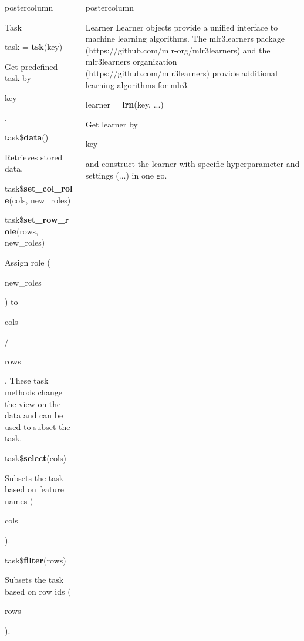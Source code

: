 \documentclass{beamer}
\newlength{\columnheight} %
\newcommand{\codeinline}[1]{\begin{codeboxinline}#1\end{codeboxinline}}
\begin{document}
\begin{frame}[fragile]{}
\begin{columns}
\begin{column}{.245\textwidth}
\begin{beamercolorbox}[center]{postercolumn}
\begin{minipage}{.98\textwidth}
{\begin{myblock}{Task}
\begin{codebox}
								task = \textbf{tsk}(key)
							\end{codebox}
							Get predefined task by \codeinline{key}.
							\\
							\begin{codebox}
								task\$\textbf{data}()
							\end{codebox}
							Retrieves stored data.
							\\
							\begin{codebox}
								task\$\textbf{set\_col\_role}(cols, new\_roles)
							\end{codebox}
							\begin{codebox}
								task\$\textbf{set\_row\_role}(rows, new\_roles)
							\end{codebox}
							Assign role (\codeinline{new\_roles}) to \codeinline{cols} / \codeinline{rows}. These task methods change the view on the data and can be used to subset the task.
							\\
							\begin{codebox}
								task\$\textbf{select}(cols)
							\end{codebox}
							Subsets the task based on feature names (\codeinline{cols}).
							\\
							\begin{codebox}
								task\$\textbf{filter}(rows)
							\end{codebox}
							Subsets the task based on row ids (\codeinline{rows}).
						\end{myblock}
						\vfill
					}
				\end{minipage}
			\end{beamercolorbox}
		\end{column}
		\begin{column}{.245\textwidth}
			\begin{beamercolorbox}[center]{postercolumn}
				\begin{minipage}{.98\textwidth}
					\parbox[t][\columnheight]{\textwidth}{
						\begin{myblock}{Learner}
							Learner objects provide a unified interface to machine learning algorithms. The mlr3learners package (https://github.com/mlr-org/mlr3learners) and the mlr3learners organization (https://github.com/mlr3learners) provide additional learning algorithms for mlr3.
							\\
							\begin{codebox}
								learner = \textbf{lrn}(key, ...)
							\end{codebox}
							Get learner by \codeinline{key} and construct the learner with specific hyperparameter and settings (...) in one go.

\end{myblock}}
\end{minipage}
\end{beamercolorbox}
\end{column}
\end{columns}
\end{frame}
\end{document}
